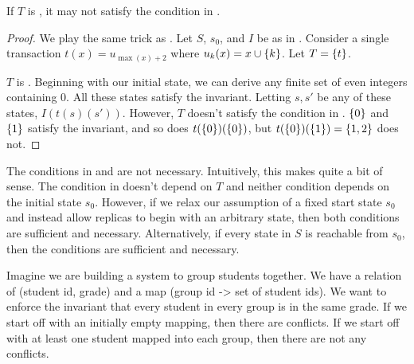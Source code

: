 \begin{claim}
  If $T$ is \Iconfluent, it may not satisfy the condition in
  .
\end{claim}
\begin{proof}
  We play the same trick as . Let $S$, $s_0$,
  and $I$ be as in . Consider a single
  transaction $t(x) = u_{\max(x) + 2}$ where $u_k(x) = x \cup \{k\}$. Let $T
  = \{t\}$.

  $T$ is \Iconfluent{}. Beginning with our initial state, we can derive any
  finite set of even integers containing $0$. All these states satisfy the
  invariant. Letting $s, s'$ be any of these states, $I(t(s)(s'))$.
  However, $T$ doesn't satisfy the condition in .
  $\{0\}$ and $\{1\}$ satisfy the invariant, and so does
  $t(\{0\})(\{0\})$, but $t(\{0\})(\{1\}) = \{1, 2\}$ does not.
\end{proof}


The conditions in  and 
are not necessary. Intuitively, this makes quite a bit of sense. The condition
in  doesn't depend on $T$ and neither condition
depends on the initial state $s_0$. However, if we relax our assumption of a
fixed start state $s_0$ and instead allow replicas to begin with an arbitrary
state, then both conditions are sufficient and necessary. Alternatively, if
every state in $S$ is reachable from $s_0$, then the conditions are sufficient
and necessary.


Imagine we are building a system to group students together. We have a relation
of (student id, grade) and a map (group id -> set of student ids). We want to
enforce the invariant that every student in every group is in the same grade.
If we start off with an initially empty mapping, then there are conflicts. If
we start off with at least one student mapped into each group, then there are
not any conflicts.


